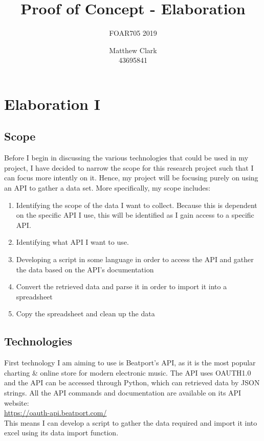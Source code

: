 \documentclass{article}
\title{Proof of Concept - Elaboration}
\subtitle{FOAR705 2019}
\author{Matthew Clark\\43695841}
\date{\vspace{-5ex}} %
\begin{document}
\doublespacing
\maketitle
\newpage
\tableofcontents
\newpage
\section{Elaboration I}
\subsection{Scope}
Before I begin in discussing the various technologies that could be used in my project, I have decided to narrow the scope for this research project such that I can focus more intently on it. Hence, my project will be focusing purely on using an API to gather a data set. More specifically, my scope includes:
\begin{enumerate}
    \item Identifying the scope of the data I want to collect. Because this is dependent on the specific API I use, this will be identified as I gain access to a specific API.
    \item Identifying what API I want to use.
    \item Developing a script in some language in order to access the API and gather the data based on the API's documentation
    \item Convert the retrieved data and parse it in order to import it into a spreadsheet
    \item Copy the spreadsheet and clean up the data
\end{enumerate}
\subsection{Technologies}
First technology I am aiming to use is Beatport's API, as it is the most popular charting & online store for modern electronic music. The API uses OAUTH1.0 and the API can be accessed through Python, which can retrieved data by JSON strings. All the API commands and documentation are available on its API website:\\\url{https://oauth-api.beatport.com/}\\This means I can develop a script to gather the data required and import it into excel using its data import function.
\end{document}
